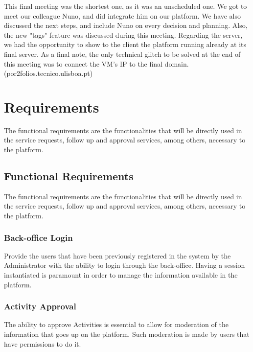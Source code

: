\documentclass[a4paper,12pt,journal,twoside,compsoc]{PPIEEEtran}
\begin{document}
	This final meeting was the shortest one, as it was an unscheduled one. We got to meet our colleague Nuno, and did integrate him on our platform. We have also discussed the next steps, and include Nuno on every decision and planning. Also, the new "tags" feature was discussed during this meeting.
	Regarding the server, we had the opportunity to show to the client the platform running already at its final server.
	As a final note, the only technical glitch to be solved at the end of this meeting was to connect the VM's IP to the final domain.
	(por2folios.tecnico.ulisboa.pt)


\section{Requirements}

The functional requirements are the functionalities that will be directly used in the service requests, follow up and approval services, among others, necessary to the platform.

\subsection{Functional Requirements}

The functional requirements are the functionalities that will be directly used in the service requests, follow up and approval services, among others, necessary to the platform.

\subsubsection{Back-office Login}

Provide the users that have been previously registered in the system by the Administrator with the ability to login through the back-office. Having a session instantiated is paramount in order to manage the information available in the platform.

\subsubsection{Activity Approval}

The ability to approve Activities is essential to allow for moderation of the information that goes up on the platform. Such moderation is made by users that have permissions to do it.
\end{document}
